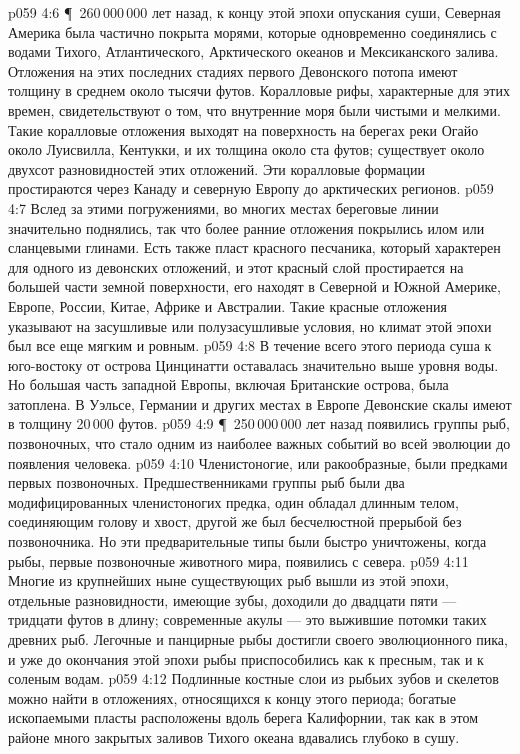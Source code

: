 \vs p059 4:6 \P\ 260\,000\,000 лет назад, к концу этой эпохи опускания суши, Северная Америка была частично покрыта морями, которые одновременно соединялись с водами Тихого, Атлантического, Арктического океанов и Мексиканского залива. Отложения на этих последних стадиях первого Девонского потопа имеют толщину в среднем около тысячи футов. Коралловые рифы, характерные для этих времен, свидетельствуют о том, что внутренние моря были чистыми и мелкими. Такие коралловые отложения выходят на поверхность на берегах реки Огайо около Луисвилла, Кентукки, и их толщина около ста футов; существует около двухсот разновидностей этих отложений. Эти коралловые формации простираются через Канаду и северную Европу до арктических регионов.
\vs p059 4:7 Вслед за этими погружениями, во многих местах береговые линии значительно поднялись, так что более ранние отложения покрылись илом или сланцевыми глинами. Есть также пласт красного песчаника, который характерен для одного из девонских отложений, и этот красный слой простирается на большей части земной поверхности, его находят в Северной и Южной Америке, Европе, России, Китае, Африке и Австралии. Такие красные отложения указывают на засушливые или полузасушливые условия, но климат этой эпохи был все еще мягким и ровным.
\vs p059 4:8 В течение всего этого периода суша к юго\hyp{}востоку от острова Цинцинатти оставалась значительно выше уровня воды. Но большая часть западной Европы, включая Британские острова, была затоплена. В Уэльсе, Германии и других местах в Европе Девонские скалы имеют в толщину 20\,000 футов.
\vs p059 4:9 \P\ 250\,000\,000 лет назад появились группы рыб, позвоночных, что стало одним из наиболее важных событий во всей эволюции до появления человека.
\vs p059 4:10 Членистоногие, или ракообразные, были предками первых позвоночных. Предшественниками группы рыб были два модифицированных членистоногих предка, один обладал длинным телом, соединяющим голову и хвост, другой же был бесчелюстной прерыбой без позвоночника. Но эти предварительные типы были быстро уничтожены, когда рыбы, первые позвоночные животного мира,  появились с севера.
\vs p059 4:11 Многие из крупнейших ныне существующих рыб вышли из этой эпохи, отдельные разновидности, имеющие зубы, доходили до двадцати пяти --- тридцати футов в длину; современные акулы --- это выжившие потомки таких древних рыб. Легочные и панцирные рыбы достигли своего эволюционного пика, и уже до окончания этой эпохи рыбы приспособились как к пресным, так и к соленым водам.
\vs p059 4:12 Подлинные костные слои из рыбьих зубов и скелетов можно найти в отложениях, относящихся к концу этого периода; богатые ископаемыми пласты расположены вдоль берега Калифорнии, так как в этом районе много закрытых заливов Тихого океана вдавались глубоко в сушу.
